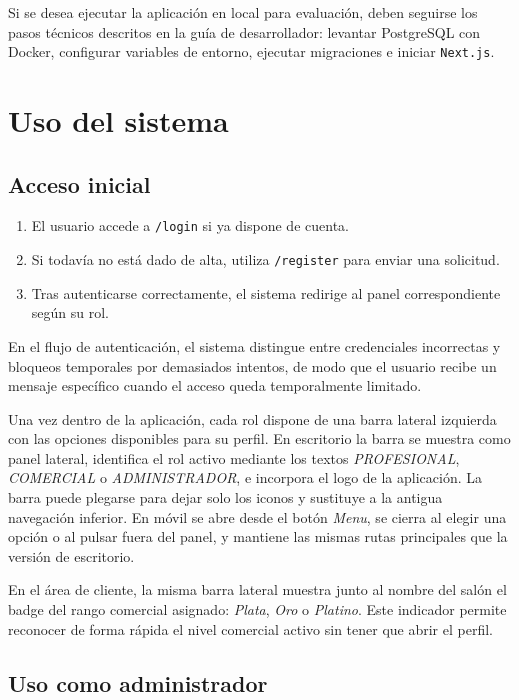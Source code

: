 Si se desea ejecutar la aplicación en local para evaluación, deben seguirse los pasos técnicos descritos en la guía de desarrollador: levantar PostgreSQL con Docker, configurar variables de entorno, ejecutar migraciones e iniciar \texttt{Next.js}.

\section{Uso del sistema}

\subsection{Acceso inicial}

\begin{enumerate}
    \item El usuario accede a \texttt{/login} si ya dispone de cuenta.
    \item Si todavía no está dado de alta, utiliza \texttt{/register} para enviar una solicitud.
    \item Tras autenticarse correctamente, el sistema redirige al panel correspondiente según su rol.
\end{enumerate}

En el flujo de autenticación, el sistema distingue entre credenciales incorrectas y bloqueos temporales por demasiados intentos, de modo que el usuario recibe un mensaje específico cuando el acceso queda temporalmente limitado.

Una vez dentro de la aplicación, cada rol dispone de una barra lateral izquierda con las opciones disponibles para su perfil. En escritorio la barra se muestra como panel lateral, identifica el rol activo mediante los textos \textit{PROFESIONAL}, \textit{COMERCIAL} o \textit{ADMINISTRADOR}, e incorpora el logo de la aplicación. La barra puede plegarse para dejar solo los iconos y sustituye a la antigua navegación inferior. En móvil se abre desde el botón \textit{Menu}, se cierra al elegir una opción o al pulsar fuera del panel, y mantiene las mismas rutas principales que la versión de escritorio.

En el área de cliente, la misma barra lateral muestra junto al nombre del salón el badge del rango comercial asignado: \textit{Plata}, \textit{Oro} o \textit{Platino}. Este indicador permite reconocer de forma rápida el nivel comercial activo sin tener que abrir el perfil.

\subsection{Uso como administrador}

